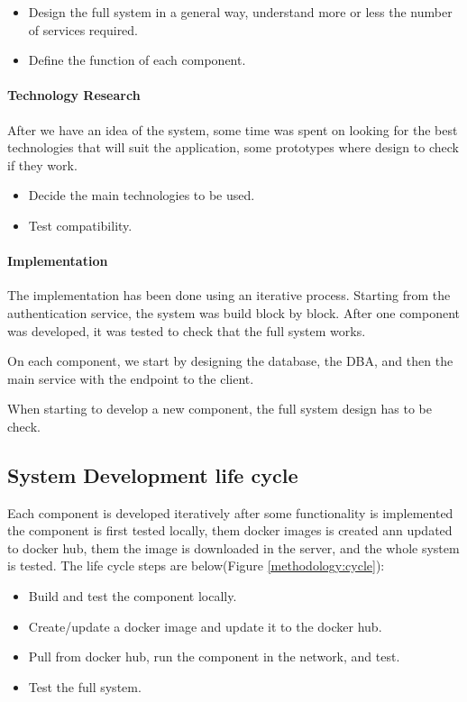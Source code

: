\begin{itemize}
	\item Design the full system in a general way, understand more or less the number of services required.
	\item Define the function of each component.
	
\end{itemize}


\paragraph{Technology Research}

After we have an idea of the system, some time was spent on looking for the best technologies that will suit the application, some prototypes where design to check if they work.

\begin{itemize}
	\item Decide the main technologies to be used.
	\item	Test compatibility. 
\end{itemize}



\paragraph{ Implementation}

The implementation has been done using an iterative process. Starting from the authentication service, the system was build block by block. After one component was developed, it was tested to check that the full system works. 

On each component, we start by designing the database, the DBA, and then the main service with the endpoint to the client.

When starting to develop a new component, the full system design has to be check.


\subsection{System Development life cycle}
\indent
\indent
Each component is developed iteratively after some functionality is implemented the component is first tested locally, them docker images is created ann updated to docker hub, them the image is downloaded in the server, and the whole system is tested. The life cycle steps are below(Figure \ref{methodology:cycle}):

\begin{itemize}
	\item Build and test the component locally.
	\item Create/update a docker image and update it to the docker hub.
	\item Pull from docker hub, run the component in the network, and test.
	\item Test the full system. 
\end{itemize}


